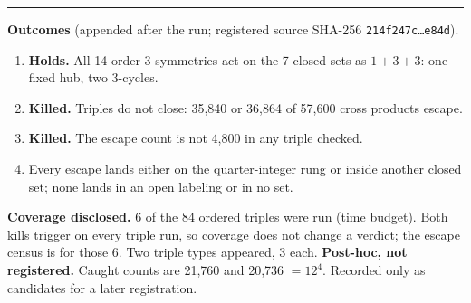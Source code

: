 \documentclass[11pt,a4paper]{article}
\begin{document}
\hrule\vspace{0.4em}
\textbf{Outcomes} (appended after the run; registered source SHA-256 \texttt{214f247c\ldots e84d}).
\begin{enumerate}
\item[H1] \textbf{Holds.} All 14 order-3 symmetries act on the 7 closed sets as $1+3+3$: one fixed hub, two 3-cycles.
\item[H2] \textbf{Killed.} Triples do not close: 35,840 or 36,864 of 57,600 cross products escape.
\item[H3] \textbf{Killed.} The escape count is not 4,800 in any triple checked.
\item[E1] Every escape lands either on the quarter-integer rung or inside another closed set; none lands in an open labeling or in no set.
\end{enumerate}
\textbf{Coverage disclosed.} 6 of the 84 ordered triples were run (time budget). Both kills trigger on every triple run, so coverage does not change a verdict; the escape census is for those 6. Two triple types appeared, 3 each.
\textbf{Post-hoc, not registered.} Caught counts are 21,760 and 20,736 $=12^4$. Recorded only as candidates for a later registration.
\end{document}
